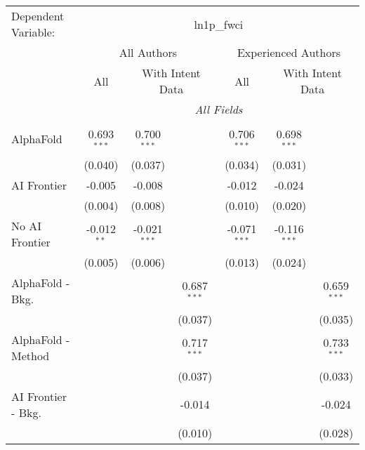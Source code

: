 \begingroup
\centering
\begin{tabular}{lcccccc}
   \tabularnewline \midrule \midrule
   Dependent Variable: & \multicolumn{6}{c}{ln1p\_fwci}\\
 & \multicolumn{3}{c}{All Authors} & \multicolumn{3}{c}{Experienced Authors} \\
\cmidrule(lr){2-4} \cmidrule(lr){5-7}
 & \multicolumn{1}{c}{All} & \multicolumn{2}{c}{With Intent Data} & \multicolumn{1}{c}{All} & \multicolumn{2}{c}{With Intent Data} \\
\cmidrule(lr){2-2} \cmidrule(lr){3-4} \cmidrule(lr){5-5} \cmidrule(lr){6-7}
 & \multicolumn{6}{c}{\textit{All Fields}} \\ \\
   AlphaFold               & 0.693$^{***}$ & 0.700$^{***}$  &                & 0.706$^{***}$  & 0.698$^{***}$  &   \\   
                           & (0.040)       & (0.037)        &                & (0.034)        & (0.031)        &   \\   
   AI Frontier             & -0.005        & -0.008         &                & -0.012         & -0.024         &   \\   
                           & (0.004)       & (0.008)        &                & (0.010)        & (0.020)        &   \\   
   No AI Frontier          & -0.012$^{**}$ & -0.021$^{***}$ &                & -0.071$^{***}$ & -0.116$^{***}$ &   \\   
                           & (0.005)       & (0.006)        &                & (0.013)        & (0.024)        &   \\   
   AlphaFold - Bkg.        &               &                & 0.687$^{***}$  &                &                & 0.659$^{***}$\\   
                           &               &                & (0.037)        &                &                & (0.035)\\   
   AlphaFold - Method      &               &                & 0.717$^{***}$  &                &                & 0.733$^{***}$\\   
                           &               &                & (0.037)        &                &                & (0.033)\\   
   AI Frontier - Bkg.      &               &                & -0.014         &                &                & -0.024\\   
                           &               &                & (0.010)        &                &                & (0.028)\\   

\end{tabular}
